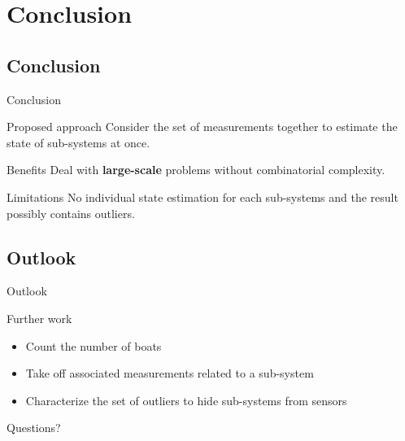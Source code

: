 \documentclass{beamer}
\begin{document}
        

    \section{Conclusion}

        \subsection{Conclusion}

            \begin{frame}{Conclusion}
                \centering
                \begin{minipage}{0.8\textwidth}
                    \begin{block}{Proposed approach}
                        Consider the set of measurements together to estimate the state of sub-systems at once.
                    \end{block}
                    \begin{block}{Benefits}
                        Deal with \textbf{large-scale} problems without combinatorial complexity.
                    \end{block}
                    \begin{block}{Limitations}
                        No individual state estimation for each sub-systems and the result possibly contains outliers.
                    \end{block}
                \end{minipage}
            \end{frame}

        \subsection{Outlook}

            \begin{frame}{Outlook}
                \centering
                \begin{minipage}{0.8\textwidth}
                    \begin{block}{Further work}
                        \vspace{0.25cm}
                        \begin{itemize}
                            \item Count the number of boats
                            \item Take off associated measurements related to a sub-system
                            \item Characterize the set of outliers to hide sub-systems from sensors
                        \end{itemize}
                    \end{block}
                \end{minipage}
            \end{frame}
    
    \appendix

    \begin{frame}[standout]
        Questions?
    \end{frame}
    
\end{document}

